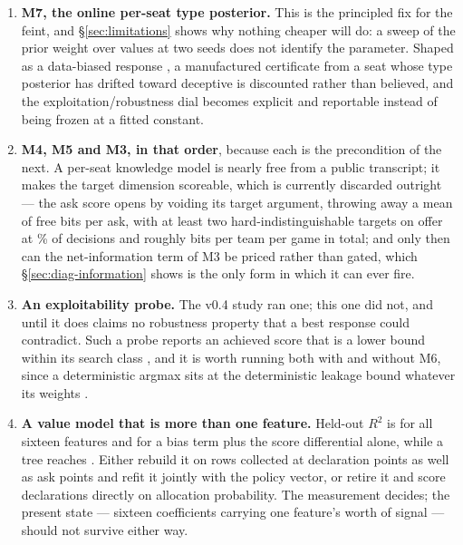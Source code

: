 \begin{enumerate}[leftmargin=1.4em,itemsep=1pt,topsep=2pt,parsep=0pt]
\item \textbf{M7, the online per-seat type posterior.} This is the principled fix
      for the feint, and \S\ref{sec:limitations} shows why nothing cheaper will
      do: a sweep of the prior weight over \numThetaSweepN{} values at two seeds
      does not identify the parameter. Shaped as a data-biased response
      \cite{johanson-dbr}, a manufactured certificate from a seat whose type
      posterior has drifted toward deceptive is discounted rather than believed,
      and the exploitation/robustness dial becomes explicit and reportable
      \cite{johanson-rnash} instead of being frozen at a fitted constant.
\item \textbf{M4, M5 and M3, in that order}, because each is the precondition of
      the next. A per-seat knowledge model is nearly free from a public
      transcript; it makes the target dimension scoreable, which is currently
      discarded outright --- the ask score opens by voiding its target argument,
      throwing away a mean of \numTargetBits{} free bits per ask, with at least
      two hard-indistinguishable targets on offer at \numTargetTwo\% of
      decisions and roughly \numTargetBitsGame{} bits per team per game in
      total; and only
      then can the net-information term of M3 be priced rather than gated, which
      \S\ref{sec:diag-information} shows is the only form in which it can ever
      fire.
\item \textbf{An exploitability probe.} The v0.4 study ran one; this one
      did not, and until it does \vfive{} claims no robustness property that a best
      response could contradict. Such a probe reports an achieved score that is
      a lower bound within its search class \cite{lisy-lbr}, and it is worth
      running both with and without M6, since a deterministic argmax sits at
      the deterministic leakage bound whatever its weights
      \cite{alvim-leakage}.
\item \textbf{A value model that is more than one feature.} Held-out $R^2$ is
      \numValueRSq{} for all sixteen features and \numValueRSqScore{} for a bias
      term plus the score differential alone, while a tree reaches
      \numValueRSqTree{}. Either rebuild it on rows collected at declaration
      points as well as ask points and refit it jointly with the policy vector,
      or retire it and score declarations directly on allocation probability.
      The measurement decides; the present state --- sixteen coefficients
      carrying one feature's worth of signal --- should not survive either way.
\end{enumerate}

